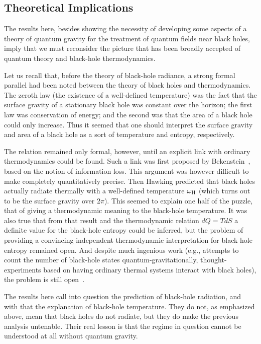 \documentclass[11pt]{article}
\begin{document}
\subsection{Theoretical Implications}

The results here, besides showing the necessity of developing some aspects of a
theory of quantum gravity for the treatment of quantum fields near black holes,
imply that we must reconsider the picture that has been broadly accepted of
quantum theory and black-hole thermodynamics.

Let us recall that, before the theory of black-hole radiance, a strong formal
parallel had been noted between the theory of black holes and thermodynamics. 
The zeroth law (the existence of a well-defined temperature) was the fact that
the surface gravity of a stationary black hole was constant over the horizon;
the first law was conservation of energy; and the second was that the area of a
black hole could only increase.  Thus it seemed that one should interpret the
surface gravity and area of a black hole as a sort of temperature and entropy,
respectively.

The relation remained only formal, however, until an explicit link with
ordinary thermodynamics could be found.  Such a link was first proposed by
Bekenstein~\cite{Bekenstein:1973}, based on the notion of information loss. 
This argument was however difficult to make completely quantitatively precise. 
Then Hawking predicted that black holes actually radiate thermally with a
well-defined temperature $\omega _{\rm H}$ (which turns out to be the surface
gravity over $2\pi$).  This seemed to explain one half of the puzzle, that of
giving a thermodynamic meaning to the black-hole temperature.  It was also true
that from that result and the thermodynamic relation $dQ=TdS$ a definite value
for the black-hole entropy could be inferred, but the problem of providing a
convincing independent thermodynamic interpretation for black-hole entropy
remained open.  And despite much ingenious work (e.g., attempts to count the
number of black-hole states quantum-gravitationally, thought-experiments based
on having ordinary thermal systems interact with black holes), the problem is
still open~\cite{Helfer:2003}.

The results here call into question the prediction of black-hole radiation, and
with that the explanation of black-hole temperature.  They do not, as
emphasized above, mean that black holes do not radiate, but they do make the
previous analysis untenable.    Their real lesson is that the regime in
question cannot be understood at all without quantum gravity.
\end{document}
